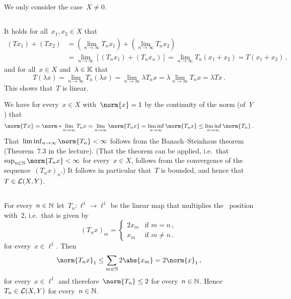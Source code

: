 \section{}

We only consider the case~$X \neq 0$.





\subsection{}

It holds for all~$x_1, x_2 \in X$ that
\begin{align*}
      (T x_1) + (T x_2)
  &=  \left( \lim_{n \to \infty} T_n x_1 \right) + \left( \lim_{n \to \infty} T_n x_2 \right) \\
  &=  \lim_{n \to \infty} [ (T_n x_1) + (T_n x_n) ]
   = \lim_{n \to \infty} T_n(x_1 + x_2)
   = T (x_1 + x_2)  \,,
\end{align*}
and for all~$x \in X$ and~$\lambda \in \mathbb{K}$ that
\[
    T(\lambda x)
  = \lim_{n \to \infty} T_n(\lambda x)
  = \lim_{n \to \infty} \lambda T_n x
  = \lambda \lim_{n \to \infty} T_n x
  = \lambda T x \,.
\]
This shows that~$T$ is linear.

We have for every~$x \in X$ with~$\norm{x} = 1$ by the continuity of the norm (of~$Y$) that
\[
        \norm{T x}
  =     \norm*{\lim_{n \to \infty} T_n x}
  =     \lim_{n \to \infty} \norm{T_n x}
  =     \liminf_{n \to \infty} \norm{T_n x}
  \leq  \liminf_{n \to \infty} \norm{T_n} \,.
\]
That~$\liminf_{n \to \infty} \norm{T_n} < \infty$ follows from the Banach--Steinhaus theorem (Theorem~7.3 in the lecture).
(That the theorem can be applied, i.e.\ that~$\sup_{n \in \Natural} \norm{T_n x} < \infty$ for every~$x \in X$, follows from the convergence of the sequence~$(T_n x)_n$.)
It follows in particular that~$T$ is bounded, and hence that~$T \in \mathcal{L}(X,Y)$.





\subsection{}

For every~$n \in \mathbb{N}$ let~$T_n \colon \ell^1 \to \ell^1$ be the linear map that multiplies the~ position with~$2$, i.e.\ that is given by
\[
    (T_n x)_m
  = \begin{cases}
      2 x_m & \text{if~$m = n$}     \,, \\
        x_m & \text{if~$m \neq n$}  \,.
    \end{cases}
\]
for every~$x \in \ell^1$.
Then
\[
        \norm{T_n x}_1
  \leq  \sum_{m \in \Natural} 2 \abs{x_m}
  =     2 \norm{x}_1 \,,
\]
for every~$x \in \ell^1$ and therefore~$\norm{T_n} \leq 2$ for every~$n \in \mathbb{N}$.
Hence~$T_n \in \mathcal{L}(X,Y)$ for every~$n \in \mathbb{N}$.

